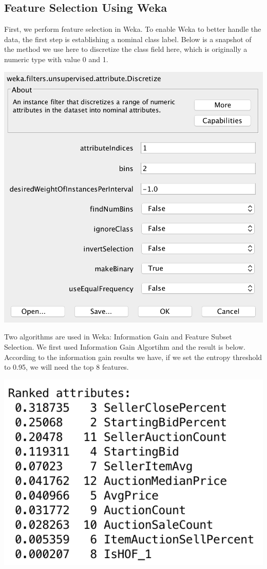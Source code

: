 \documentclass[CEJM,PDF]{cej} %
\begin{document}
\subsection{Feature Selection Using Weka}
First, we perform feature selection in Weka. To enable Weka to better handle the data, the first step is establishing a nominal class label. Below is a snapshot of the method we use here to discretize the class field here, which is originally a numeric type with value 0 and 1.

{\centering
    \vspace{3 mm}
    \includegraphics[scale=0.4]{weka-discretize_label_column.png}
    \par
}


Two algorithms are used in Weka: Information Gain and Feature Subset Selection. We first used Information Gain Algortihm and the result is below. According to the information gain results we have, if we set the entropy threshold to 0.95, we will need the top 8 features.

{\centering
    \vspace{3 mm}
    \includegraphics[scale=0.6]{weka-InfoGain.png}
    \par
}
\end{document}
